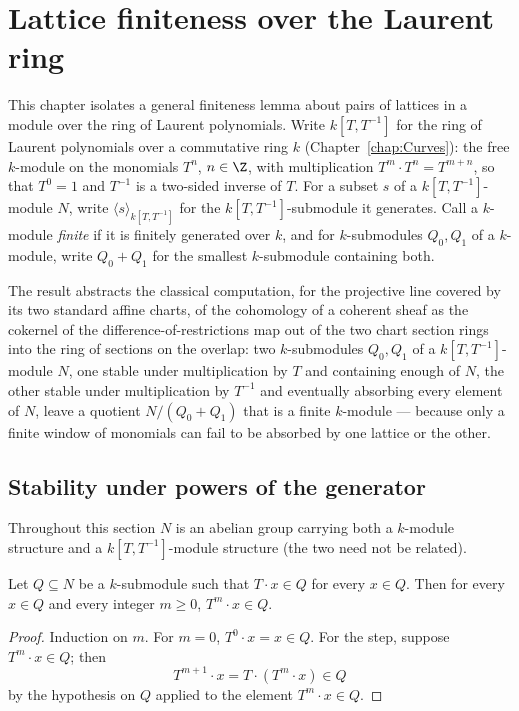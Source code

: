 \chapter{Lattice finiteness over the Laurent ring}
\label{chap:Algebra}

This chapter isolates a general finiteness lemma about pairs of lattices in a module over
the ring of Laurent polynomials. Write \(k[T, T^{-1}]\) for the ring of Laurent polynomials
over a commutative ring \(k\) (Chapter~\ref{chap:Curves}): the free \(k\)-module on the
monomials \(T^n\), \(n \in \Z\), with multiplication \(T^m \cdot T^n = T^{m+n}\), so that
\(T^0 = 1\) and \(T^{-1}\) is a two-sided inverse of \(T\). For a subset \(s\) of a
\(k[T,T^{-1}]\)-module \(N\), write \(\langle s \rangle_{k[T,T^{-1}]}\) for the
\(k[T,T^{-1}]\)-submodule it generates. Call a \(k\)-module \emph{finite} if it is finitely
generated over \(k\), and for \(k\)-submodules \(Q_0, Q_1\) of a \(k\)-module, write
\(Q_0 + Q_1\) for the smallest \(k\)-submodule containing both.

The result abstracts the classical computation, for the projective line covered by its two
standard affine charts, of the cohomology of a coherent sheaf as the cokernel of the
difference-of-restrictions map out of the two chart section rings into the ring of sections
on the overlap: two \(k\)-submodules \(Q_0, Q_1\) of a \(k[T,T^{-1}]\)-module \(N\), one
stable under multiplication by \(T\) and containing enough of \(N\), the other stable under
multiplication by \(T^{-1}\) and eventually absorbing every element of \(N\), leave a quotient
\(N / (Q_0 + Q_1)\) that is a finite \(k\)-module — because only a finite window of monomials
can fail to be absorbed by one lattice or the other.

\section{Stability under powers of the generator}

Throughout this section \(N\) is an abelian group carrying both a \(k\)-module structure and a
\(k[T,T^{-1}]\)-module structure (the two need not be related).

\begin{lemma}
  \label{lem:T_pow_stable}
  \leanok
  Let \(Q \subseteq N\) be a \(k\)-submodule such that \(T \cdot x \in Q\) for every
  \(x \in Q\). Then for every \(x \in Q\) and every integer \(m \ge 0\), \(T^m \cdot x \in Q\).
\end{lemma}
\begin{proof}
  \leanok
  Induction on \(m\). For \(m = 0\), \(T^0 \cdot x = x \in Q\). For the step, suppose
  \(T^m \cdot x \in Q\); then
  \[
    T^{m+1} \cdot x = T \cdot (T^m \cdot x) \in Q
  \]
  by the hypothesis on \(Q\) applied to the element \(T^m \cdot x \in Q\).
\end{proof}

